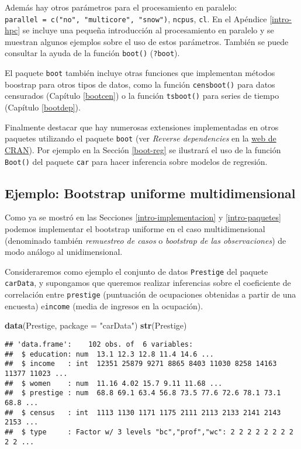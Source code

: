 \documentclass[]{book}
\newenvironment{Shaded}{\begin{snugshade}}{\end{snugshade}}
\newcommand{\KeywordTok}[1]{\textcolor[rgb]{0.13,0.29,0.53}{\textbf{#1}}}
\newcommand{\DataTypeTok}[1]{\textcolor[rgb]{0.13,0.29,0.53}{#1}}
\newcommand{\StringTok}[1]{\textcolor[rgb]{0.31,0.60,0.02}{#1}}
\newcommand{\NormalTok}[1]{#1}
\theoremstyle{break}
\theoremstyle{definition}
\theoremstyle{definition}
\theoremstyle{definition}
\theoremstyle{remark}
\begin{document}
Además hay otros parámetros para el procesamiento en paralelo:
\texttt{parallel\ =\ c("no",\ "multicore",\ "snow")}, \texttt{ncpus},
\texttt{cl}. En el Apéndice \ref{intro-hpc} se incluye una pequeña
introducción al procesamiento en paralelo y se muestran algunos ejemplos
sobre el uso de estos parámetros. También se puede consultar la ayuda de
la función \texttt{boot()} (\texttt{?boot}).

El paquete \texttt{boot} también incluye otras funciones que implementan
métodos boostrap para otros tipos de datos, como la función
\texttt{censboot()} para datos censurados (Capítulo \ref{bootcen}) o la
función \texttt{tsboot()} para series de tiempo (Capítulo
\ref{bootdep}).

Finalmente destacar que hay numerosas extensiones implementadas en otros
paquetes utilizando el paquete \texttt{boot} (ver \emph{Reverse
dependencies} en la \href{https://cran.r-project.org/package=boot}{web
de CRAN}). Por ejemplo en la Sección \ref{boot-reg} se ilustrará el uso
de la función \texttt{Boot()} del paquete \texttt{car} para hacer
inferencia sobre modelos de regresión.

\subsection{Ejemplo: Bootstrap uniforme
multidimensional}\label{boot-unif-multi}

Como ya se mostró en las Secciones \ref{intro-implementacion} y
\ref{intro-paquetes} podemos implementar el bootstrap uniforme en el
caso multidimensional (denominado también \emph{remuestreo de casos} o
\emph{bootstrap de las observaciones}) de modo análogo al
unidimensional.

Consideraremos como ejemplo el conjunto de datos \texttt{Prestige} del
paquete \texttt{carData}, y supongamos que queremos realizar inferencias
sobre el coeficiente de correlación entre \texttt{prestige} (puntuación
de ocupaciones obtenidas a partir de una encuesta) e\texttt{income}
(media de ingresos en la ocupación).

\begin{Shaded}
\begin{Highlighting}[]
\KeywordTok{data}\NormalTok{(Prestige, }\DataTypeTok{package =} \StringTok{"carData"}\NormalTok{)}
\KeywordTok{str}\NormalTok{(Prestige)}
\end{Highlighting}
\end{Shaded}

\begin{verbatim}
## 'data.frame':    102 obs. of  6 variables:
##  $ education: num  13.1 12.3 12.8 11.4 14.6 ...
##  $ income   : int  12351 25879 9271 8865 8403 11030 8258 14163 11377 11023 ...
##  $ women    : num  11.16 4.02 15.7 9.11 11.68 ...
##  $ prestige : num  68.8 69.1 63.4 56.8 73.5 77.6 72.6 78.1 73.1 68.8 ...
##  $ census   : int  1113 1130 1171 1175 2111 2113 2133 2141 2143 2153 ...
##  $ type     : Factor w/ 3 levels "bc","prof","wc": 2 2 2 2 2 2 2 2 2 2 ...
\end{verbatim}
\end{document}
